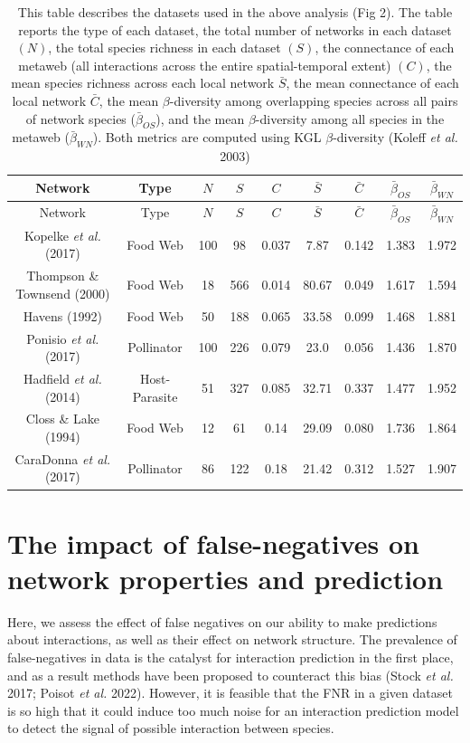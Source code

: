\documentclass[11pt]{article}
\begin{document}
\hypertarget{tbl:id}{}
\begin{longtable}[]{@{}ccccccccc@{}}
\caption{\label{tbl:id}This table describes the datasets used in the
above analysis (Fig 2). The table reports the type of each dataset, the
total number of networks in each dataset \((N)\), the total species
richness in each dataset \((S)\), the connectance of each metaweb (all
interactions across the entire spatial-temporal extent) \((C)\), the
mean species richness across each local network \(\bar{S}\), the mean
connectance of each local network \(\bar{C}\), the mean
\(\beta\)-diversity among overlapping species across all pairs of
network species (\(\bar{\beta}_{OS}\)), and the mean \(\beta\)-diversity
among all species in the metaweb (\(\bar{\beta}_{WN}\)). Both metrics
are computed using KGL \(\beta\)-diversity (Koleff \emph{et al.}
2003)}\tabularnewline
\toprule
Network & Type & \(N\) & \(S\) & \(C\) & \(\bar{S}\) & \(\bar{C}\) &
\(\bar{\beta}_{OS}\) & \(\bar{\beta}_{WN}\)\tabularnewline
\midrule
\endfirsthead
\toprule
Network & Type & \(N\) & \(S\) & \(C\) & \(\bar{S}\) & \(\bar{C}\) &
\(\bar{\beta}_{OS}\) & \(\bar{\beta}_{WN}\)\tabularnewline
\midrule
\endhead
Kopelke \emph{et al.} (2017) & Food Web & 100 & 98 & 0.037 & 7.87 &
0.142 & 1.383 & 1.972\tabularnewline
Thompson \& Townsend (2000) & Food Web & 18 & 566 & 0.014 & 80.67 &
0.049 & 1.617 & 1.594\tabularnewline
Havens (1992) & Food Web & 50 & 188 & 0.065 & 33.58 & 0.099 & 1.468 &
1.881\tabularnewline
Ponisio \emph{et al.} (2017) & Pollinator & 100 & 226 & 0.079 & 23.0 &
0.056 & 1.436 & 1.870\tabularnewline
Hadfield \emph{et al.} (2014) & Host-Parasite & 51 & 327 & 0.085 & 32.71
& 0.337 & 1.477 & 1.952\tabularnewline
Closs \& Lake (1994) & Food Web & 12 & 61 & 0.14 & 29.09 & 0.080 & 1.736
& 1.864\tabularnewline
CaraDonna \emph{et al.} (2017) & Pollinator & 86 & 122 & 0.18 & 21.42 &
0.312 & 1.527 & 1.907\tabularnewline
\bottomrule
\end{longtable}

\hypertarget{the-impact-of-false-negatives-on-network-properties-and-prediction}{%
\section{The impact of false-negatives on network properties and
prediction}\label{the-impact-of-false-negatives-on-network-properties-and-prediction}}

Here, we assess the effect of false negatives on our ability to make
predictions about interactions, as well as their effect on network
structure. The prevalence of false-negatives in data is the catalyst for
interaction prediction in the first place, and as a result methods have
been proposed to counteract this bias (Stock \emph{et al.} 2017; Poisot
\emph{et al.} 2022). However, it is feasible that the FNR in a given
dataset is so high that it could induce too much noise for an
interaction prediction model to detect the signal of possible
interaction between species.
\end{document}
